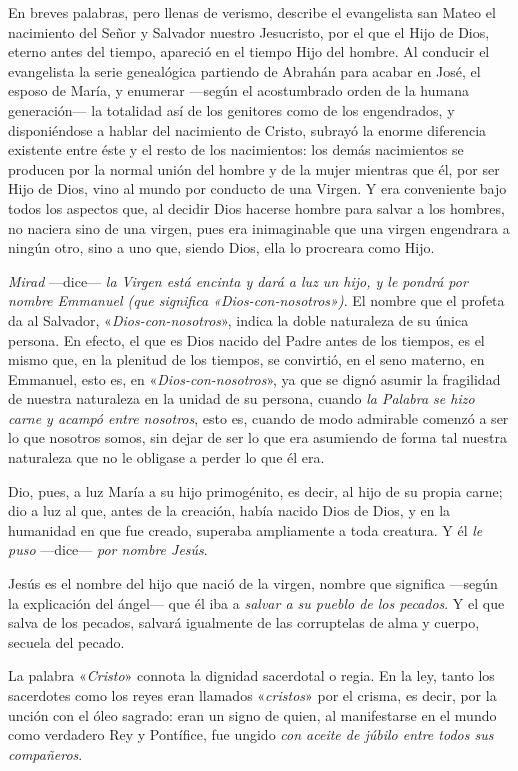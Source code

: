 \documentclass[]{article}
\begin{document}
En breves palabras, pero llenas de verismo, describe el evangelista san
Mateo el nacimiento del Señor y Salvador nuestro Jesucristo, por el que
el Hijo de Dios, eterno antes del tiempo, apareció en el tiempo Hijo del
hombre. Al conducir el evangelista la serie genealógica partiendo de
Abrahán para acabar en José, el esposo de María, y enumerar ---según el
acostumbrado orden de la humana generación--- la totalidad así de los
genitores como de los engendrados, y disponiéndose a hablar del
nacimiento de Cristo, subrayó la enorme diferencia existente entre éste
y el resto de los nacimientos: los demás nacimientos se producen por la
normal unión del hombre y de la mujer mientras que él, por ser Hijo de
Dios, vino al mundo por conducto de una Virgen. Y era conveniente bajo
todos los aspectos que, al decidir Dios hacerse hombre para salvar a los
hombres, no naciera sino de una virgen, pues era inimaginable que una
virgen engendrara a ningún otro, sino a uno que, siendo Dios, ella lo
procreara como Hijo.

\emph{Mirad} ---dice--- \emph{la Virgen está encinta y dará a luz un
hijo, y le pondrá por nombre Emmanuel (que significa
«Dios-con-nosotros»)}. El nombre que el profeta da al Salvador,
«\emph{Dios-con-nosotros}», indica la doble naturaleza de su única
persona. En efecto, el que es Dios nacido del Padre antes de los
tiempos, es el mismo que, en la plenitud de los tiempos, se convirtió,
en el seno materno, en Emmanuel, esto es, en «\emph{Dios-con-nosotros}»,
ya que se dignó asumir la fragilidad de nuestra naturaleza en la unidad
de su persona, cuando \emph{la Palabra se hizo carne y acampó entre
nosotros}, esto es, cuando de modo admirable comenzó a ser lo que
nosotros somos, sin dejar de ser lo que era asumiendo de forma tal
nuestra naturaleza que no le obligase a perder lo que él era.

Dio, pues, a luz María a su hijo primogénito, es decir, al hijo de su
propia carne; dio a luz al que, antes de la creación, había nacido Dios
de Dios, y en la humanidad en que fue creado, superaba ampliamente a
toda creatura. Y él \emph{le puso} ---dice--- \emph{por nombre Jesús}.

Jesús es el nombre del hijo que nació de la virgen, nombre que significa
---según la explicación del ángel--- que él iba a \emph{salvar a su
pueblo de los pecados}. Y el que salva de los pecados, salvará
igualmente de las corruptelas de alma y cuerpo, secuela del pecado.

La palabra «\emph{Cristo}» connota la dignidad sacerdotal o regia. En la
ley, tanto los sacerdotes como los reyes eran llamados «\emph{cristos}»
por el crisma, es decir, por la unción con el óleo sagrado: eran un
signo de quien, al manifestarse en el mundo como verdadero Rey y
Pontífice, fue ungido \emph{con aceite de júbilo entre todos sus
compañeros}.
\end{document}
